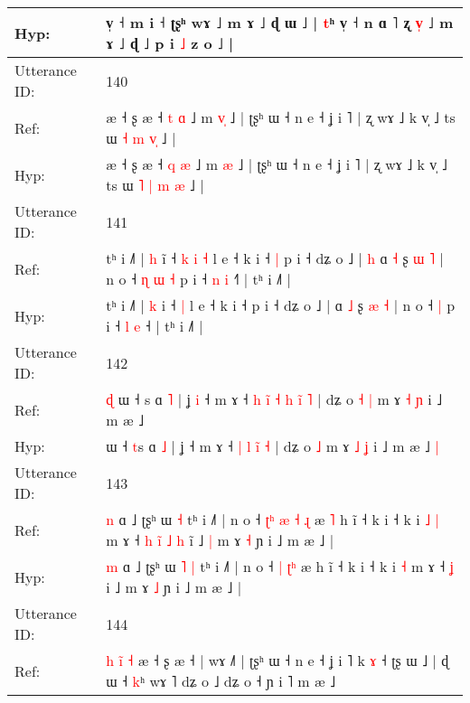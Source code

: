\documentclass[10pt]{article}
\DeclareRobustCommand{\hl}[1]{{\textcolor{red}{#1}}}
\begin{document}
\begin{longtable}{ll}
 \\
Hyp: & \hl{}\hl{}v̩ ˧ m i ˧ ʈʂʰ wɤ ˩ m ɤ ˩ ɖ ɯ ˩ | \hl{t}ʰ v̩ ˧ n ɑ ˥ ʐ \hl{v}\hl{̩} ˩ m ɤ ˩ ɖ\hl{}\hl{} ˩\hl{}\hl{} p i \hl{˩} z o ˩ |
 \\
\midrule
Utterance ID: & 140 \\
Ref: & æ ˧ ʂ æ ˧ \hl{t} \hl{ɑ} ˩ m \hl{v}\hl{̩} ˩ | ʈʂʰ ɯ ˧ n e ˧ ʝ i ˥ | ʐ wɤ ˩ k v̩ ˩ ts ɯ \hl{˧} \hl{m} \hl{}\hl{v}\hl{̩} ˩ |
 \\
Hyp: & æ ˧ ʂ æ ˧ \hl{q} \hl{æ} ˩ m \hl{}\hl{æ} ˩ | ʈʂʰ ɯ ˧ n e ˧ ʝ i ˥ | ʐ wɤ ˩ k v̩ ˩ ts ɯ \hl{˥} \hl{|} \hl{m}\hl{ }\hl{æ} ˩ |
 \\
\midrule
Utterance ID: & 141 \\
Ref: & tʰ i ˩˥ | \hl{h} i\hl{̃} ˧\hl{ }\hl{k}\hl{ }\hl{i} \hl{˧} l e ˧ k i ˧\hl{ }\hl{|} p i ˧ dʑ o ˩ |\hl{ }\hl{h} ɑ \hl{˧} ʂ \hl{ɯ} \hl{˥} | n o ˧\hl{ }\hl{ɳ}\hl{ }\hl{ɯ} \hl{˧} p i ˧ \hl{n} \hl{i} ˧\hl{˥} | tʰ i ˩˥ |
 \\
Hyp: & tʰ i ˩˥ | \hl{k} i\hl{} ˧\hl{}\hl{}\hl{}\hl{} \hl{|} l e ˧ k i ˧\hl{}\hl{} p i ˧ dʑ o ˩ |\hl{}\hl{} ɑ \hl{˩} ʂ \hl{æ} \hl{˧} | n o ˧\hl{}\hl{}\hl{}\hl{} \hl{|} p i ˧ \hl{l} \hl{e} ˧\hl{} | tʰ i ˩˥ |
 \\
\midrule
Utterance ID: & 142 \\
Ref: & \hl{ɖ}\hl{ }ɯ ˧ \hl{}s ɑ \hl{˥} | ʝ\hl{ }\hl{i} ˧ m ɤ ˧\hl{ }\hl{h} \hl{i}\hl{̃} \hl{˧} \hl{h}\hl{ }\hl{ĩ} \hl{˥} | dʑ o\hl{ }\hl{˧} \hl{|} m ɤ \hl{˧} \hl{ɲ} i ˩ m æ ˩\hl{}\hl{}
 \\
Hyp: & \hl{}\hl{}ɯ ˧ \hl{t}s ɑ \hl{˩} | ʝ\hl{}\hl{} ˧ m ɤ ˧\hl{}\hl{} \hl{}\hl{|} \hl{l} \hl{}\hl{i}\hl{̃} \hl{˧} | dʑ o\hl{}\hl{} \hl{˩} m ɤ \hl{˩} \hl{ʝ} i ˩ m æ ˩\hl{ }\hl{|}
 \\
\midrule
Utterance ID: & 143 \\
Ref: & \hl{n} ɑ ˩ ʈʂʰ ɯ\hl{}\hl{} \hl{˧} tʰ i ˩˥ | n o ˧\hl{ }\hl{ʈ}\hl{ʰ} \hl{æ} \hl{˧}\hl{ }\hl{ɻ} æ\hl{ }\hl{˥} h ĩ ˧ k i ˧ k i\hl{ }\hl{˩} \hl{|} m ɤ ˧\hl{ }\hl{h}\hl{ }\hl{i}\hl{̃}\hl{ }\hl{˩} \hl{h} i\hl{̃} ˩\hl{ }\hl{|} m ɤ \hl{˧} ɲ i ˩ m æ ˩ |
 \\
Hyp: & \hl{m} ɑ ˩ ʈʂʰ ɯ\hl{ }\hl{˥} \hl{|} tʰ i ˩˥ | n o ˧\hl{}\hl{}\hl{} \hl{|} \hl{}\hl{ʈ}\hl{ʰ} æ\hl{}\hl{} h ĩ ˧ k i ˧ k i\hl{}\hl{} \hl{˧} m ɤ ˧\hl{}\hl{}\hl{}\hl{}\hl{}\hl{}\hl{} \hl{ʝ} i\hl{} ˩\hl{}\hl{} m ɤ \hl{˩} ɲ i ˩ m æ ˩ |
 \\
\midrule
Utterance ID: & 144 \\
Ref: & \hl{}\hl{h} \hl{i}\hl{̃} \hl{˧} æ ˧ ʂ æ ˧ | wɤ ˩˥ | ʈʂʰ ɯ ˧ n e ˧ ʝ i ˥\hl{}\hl{} k \hl{ɤ} ˧ ʈʂ ɯ ˩ | ɖ ɯ ˧ \hl{k}ʰ wɤ ˥\hl{}\hl{} dʑ o ˩\hl{}\hl{} dʑ o ˧ ɲ i ˥ m æ ˩\hl{}\hl{}

\end{longtable}
\end{document}
